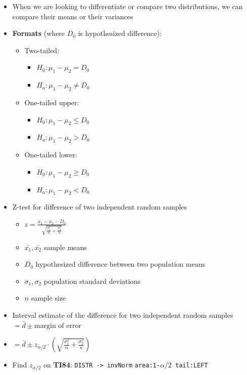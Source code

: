 \documentclass{article}
\newcommand{\code}[1]{\colorbox{light-gray}{\texttt{#1}}}
\begin{document}
\begin{itemize}
    \item When we are looking to differentiate or compare two distributions, we can compare their means or their variances
    \item \textbf{Formats} (where $D_0$ is hypothesized difference):
    \begin{itemize}
        \item Two-tailed:
        \begin{itemize}
            \item $H_0: \mu_1 - \mu_2 = D_0$
            \item $H_a: \mu_1 - \mu_2 \ne D_0$
        \end{itemize}
        \item One-tailed upper:
        \begin{itemize}
            \item $H_0: \mu_1 - \mu_2 \leq D_0$
            \item $H_a: \mu_1 - \mu_2 > D_0$
        \end{itemize}
        \item One-tailed lower:
        \begin{itemize}
            \item $H_0: \mu_1 - \mu_2 \geq D_0$
            \item $H_a: \mu_1 - \mu_2 < D_0$
        \end{itemize}
    \end{itemize}
     \item Z-test for difference of two independent random samples
    \begin{itemize}
        \item $z=\frac{\bar{x_1} - \bar{x_2} - D_0}{\sqrt{\frac{\sigma_1^2}{n}+\frac{\sigma_2^2}{n}}}$
        \item $\bar{x_1}, \bar{x_2}$ sample means
        \item $D_0$ hypothesized difference between two population means
        \item $\sigma_1, \sigma_2$ population standard deviations
        \item $n$ sample size
    \end{itemize}
    \item Interval estimate of the difference for two independent random samples $=\bar{d} \pm \text{margin of error}$
    \item $=\bar{d} \pm z_{\alpha/2} \cdot (\sqrt{\frac{\sigma_1^2}{n}+\frac{\sigma_2^2}{n}})$
    \item Find $z_{\alpha/2}$ on \textbf{TI84}: \code{DISTR -> invNorm} \code{area:1-$\alpha/2$ tail:LEFT}
\end{itemize}
\end{document}
